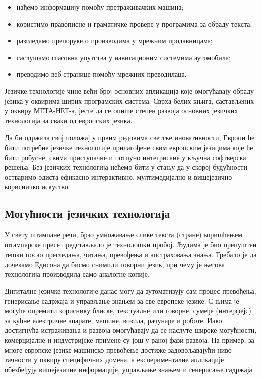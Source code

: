 \begin{multicols}{2}
\begin{itemize}
\item нађемо информацију помоћу претраживачких машина;
\item користимо правописне и граматичке провере у програмима за о\-бра\-ду текста;
\item разгледамо препоруке о производима у мрежним продавницама;
\item саслушамо гласовна упутства у навигационим системима аутомобила;
\item преводимо веб странице помоћу мрежних преводилаца.
\end{itemize}

Језичке технологије чине већи број основних апликација које омогућавају обраду језика у оквирима ширих програмских система. Сврха белих књига, састављених у оквиру МЕТА-НЕТ-а, јесте да се опише степен развоја основних језичких технологија за сваки од европских језика. 


Да би одржала свој положај у првим редовима светске иновативности, Европи ће бити потребне језичке технологије прилагођене свим европским језицима које ће бити робусне, свима приступачне и потпуно интегрисане у кључна софтверска решења. Без језичких технологија нећемо бити у стању да у скорој будућности остваримо одиста ефикасно интерактивно, мултимедијално и вишејезично корисничко искуство.

\subsection {Могућности језичких технологија}
  

У свету штампане речи, брзо умножавање слике текста (стране) коришћењем штампарске пресе пред\-став\-ља\-ло је технолошки пробој. Људима је био препуштен тешки посао прегледања, читања, превођења и апстраховања знања. Требало је да дочекамо Едисона да бисмо снимили говорни језик, при чему је његова технологија производила само аналогне копије.

Дигиталне језичке технологије данас могу да аутоматизују сам процес превођења, генерисање садржаја и управљање знањем за све европске језике. С њима је могуће опремити кориснику блиске, текстуалне или говорне, сумеђе (интерфејс) за кућне електричне апарате,  машине, возила, рачунаре и роботе. Иако достигнућа истраживања и развоја омогућавају да се наслуте широке могућности, комерцијалне и индустријске примене су још у раној фази развоја. На пример, за многе европске језике машинско превођење достиже задовољавајући ниво тачности у оквиру специфичних домена, а експерименталне апликације обезбеђују вишејезичне информације, управљање знањем и генерисање садржаја. 


\end{multicols}
